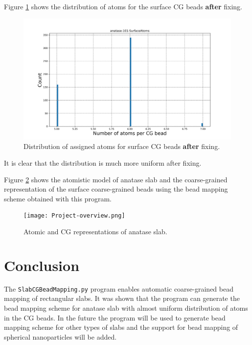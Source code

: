 \documentclass[11pt]{article}
\begin{document}
Figure \ref{fig: anatase-101 histogram} shows the distribution of atoms for the surface CG beads \textbf{after} fixing.

\begin{figure}[h]
\centering
\includegraphics[scale=0.3]{anatase-101-SurfaceAtoms.png}
\caption{Distribution of assigned atoms for surface CG beads \textbf{after} fixing.}
\label{fig: anatase-101 histogram}
\end{figure}

It is clear that the distribution is much more uniform after fixing. 

Figure \ref{fig: representations} shows the atomistic model of anatase slab and the coarse-grained representation of the surface coarse-grained beads using the bead mapping scheme obtained with this program.

\begin{figure}[h]
\centering
\texttt{[image: Project-overview.png]}
\caption{Atomic and CG representations of anatase slab.}
\label{fig: representations}
\end{figure}

\newpage
\section{Conclusion}
The \texttt{SlabCGBeadMapping.py} program enables automatic coarse-grained bead mapping of rectangular slabs. It was shown that the program can generate the bead mapping scheme for anatase slab with almost uniform distribution of atoms in the CG beads. In the future the program will be used to generate bead mapping scheme for other types of slabs and the support for bead mapping of spherical nanoparticles will be added.
\end{document}
